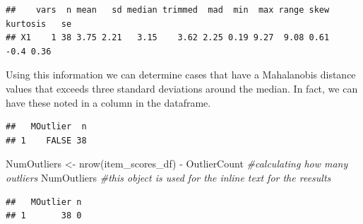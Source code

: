 \documentclass[
  english,
]{book}
\newenvironment{Shaded}{\begin{snugshade}}{\end{snugshade}}
\newcommand{\CommentTok}[1]{\textcolor[rgb]{0.56,0.35,0.01}{\textit{#1}}}
\newcommand{\ConstantTok}[1]{\textcolor[rgb]{0.00,0.00,0.00}{#1}}
\newcommand{\DecValTok}[1]{\textcolor[rgb]{0.00,0.00,0.81}{#1}}
\newcommand{\FunctionTok}[1]{\textcolor[rgb]{0.00,0.00,0.00}{#1}}
\newcommand{\NormalTok}[1]{#1}
\newcommand{\OtherTok}[1]{\textcolor[rgb]{0.56,0.35,0.01}{#1}}
\newcommand{\SpecialCharTok}[1]{\textcolor[rgb]{0.00,0.00,0.00}{#1}}
\begin{document}
\begin{verbatim}
##    vars  n mean   sd median trimmed  mad  min  max range skew kurtosis   se
## X1    1 38 3.75 2.21   3.15    3.62 2.25 0.19 9.27  9.08 0.61     -0.4 0.36
\end{verbatim}

Using this information we can determine cases that have a Mahalanobis distance values that exceeds three standard deviations around the median. In fact, we can have these noted in a column in the dataframe.

\begin{Shaded}
\end{Shaded}

\begin{verbatim}
##   MOutlier  n
## 1    FALSE 38
\end{verbatim}

\begin{Shaded}
\begin{Highlighting}[]
\NormalTok{NumOutliers }\OtherTok{\textless{}{-}} \FunctionTok{nrow}\NormalTok{(item\_scores\_df) }\SpecialCharTok{{-}}\NormalTok{ OutlierCount }\CommentTok{\#calculating how many outliers}
\NormalTok{NumOutliers }\CommentTok{\#this object is used for the inline text for the reesults}
\end{Highlighting}
\end{Shaded}

\begin{verbatim}
##   MOutlier n
## 1       38 0
\end{verbatim}
\end{document}
